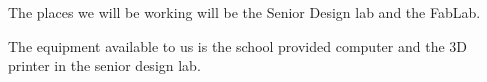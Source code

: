 The places we will be working will be the Senior Design lab and the FabLab.

The equipment available to us is the school provided computer and the 3D printer in the senior design lab.